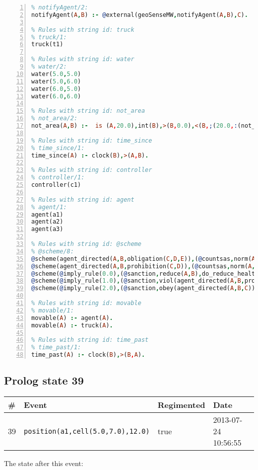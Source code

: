 \documentclass[11pt]{article}\usepackage[utf8]{inputenc}\usepackage{geometry}
\begin{document}
\begin{lstlisting}[language=Prolog, numbers=left]
% Rules with string id: notifyAgent
% notifyAgent/2:
notifyAgent(A,B) :- @external(geoSenseMW,notifyAgent(A,B),C).

% Rules with string id: truck
% truck/1:
truck(t1)

% Rules with string id: water
% water/2:
water(5.0,5.0)
water(5.0,6.0)
water(6.0,5.0)
water(6.0,6.0)

% Rules with string id: not_area
% not_area/2:
not_area(A,B) :-  is (A,20.0),int(B),>(B,0.0),<(B,;(20.0,:(not_area(A,B), is (-(B),20.0)))),int(A),>(A,0.0),<(A,;(20.0,:(area(A,B),-(int(A))))),int(B),>(A,0.0),>(B,0.0),<(A,21.0),<(B,21.0).

% Rules with string id: time_since
% time_since/1:
time_since(A) :- clock(B),>(A,B).

% Rules with string id: controller
% controller/1:
controller(c1)

% Rules with string id: agent
% agent/1:
agent(a1)
agent(a2)
agent(a3)

% Rules with string id: @scheme
% @scheme/8:
@scheme(agent_directed(A,B,obligation(C,D,E)),(@countsas,norm(A,B,F,obligation(C,D,E)),F),false,(listTrue(C)),(time_past(D)),false,[plus(viol(agent_directed(A,B,obligation(C,D,E))))|[]],[plus(obey(agent_directed(A,B,obligation(C,D,E))))|[]])
@scheme(agent_directed(A,B,prohibition(C,D)),(@countsas,norm(A,B,E,prohibition(C,D)),E),(listTrue(C)),false,(false),false,[plus(viol(agent_directed(A,B,prohibition(C,D))))|[]],[plus(obey(agent_directed(A,B,prohibition(C,D))))|[]])
@scheme(@imply_rule(0.0),(@sanction,reduce(A,B),do_reduce_health(A,B),notifyAgent(A,changed(status))),true,false,false,false,[min(reduce(A,B))|[]],[])
@scheme(@imply_rule(1.0),(@sanction,viol(agent_directed(A,B,prohibition(C,D))),do_sanction(D)),true,false,false,false,[min(viol(agent_directed(A,B,prohibition(C,D))))|[]],[])
@scheme(@imply_rule(2.0),(@sanction,obey(agent_directed(A,B,C))),true,false,false,false,[min(obey(agent_directed(A,B,C)))|[]],[])

% Rules with string id: movable
% movable/1:
movable(A) :- agent(A).
movable(A) :- truck(A).

% Rules with string id: time_past
% time_past/1:
time_past(A) :- clock(B),>(B,A).

\end{lstlisting}
\clearpage 
\subsection{Prolog state 39}
\begin{table}[ht]
\centering 
\begin{tabular}{l l l l} 
\textbf{\#} & \textbf{Event} & \textbf{Regimented} & \textbf{Date} \\ [0.5ex] 
\hline
39&\texttt{position(a1,cell(5.0,7.0),12.0)}&true&2013-07-24 10:56:55\\ [1ex] \hline\end{tabular}
\end{table}
The state after this event:
\end{document}
